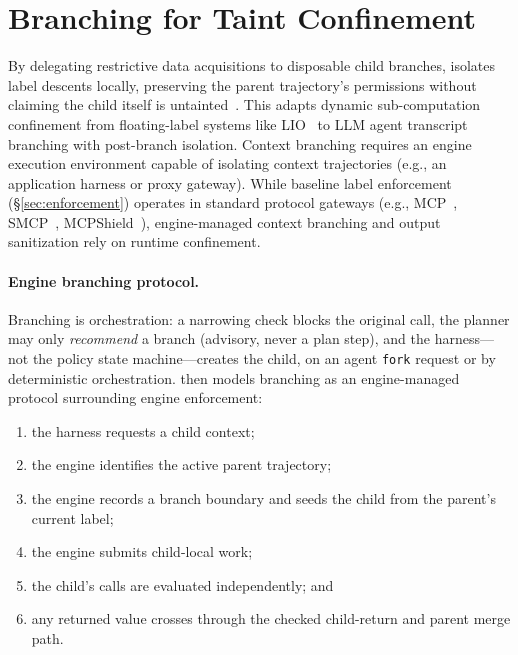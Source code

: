 \section{Branching for Taint Confinement}\label{sec:branching}

By delegating restrictive data acquisitions to disposable child branches, \appa{} isolates label descents locally, preserving the parent trajectory's permissions without claiming the child itself is untainted~\cite{caiGhostAgentRedefining2026}. This adapts dynamic sub-computation confinement from floating-label systems like LIO~\cite{stefan2011flexible} to LLM agent transcript branching with post-branch isolation. Context branching requires an engine execution environment capable of isolating context trajectories (e.g., an application harness or proxy gateway). While baseline label enforcement (\S\ref{sec:enforcement}) operates in standard protocol gateways (e.g., MCP~\cite{mcp2024spec}, SMCP~\cite{hou2026smcp}, MCPShield~\cite{zhou2026mcpshield}), engine-managed context branching and output sanitization rely on runtime confinement.




\paragraph{Engine branching protocol.}
Branching is orchestration: a narrowing check blocks the original call, the planner may only \emph{recommend} a branch (advisory, never a plan step), and the harness---not the \appa{} policy state machine---creates the child, on an agent \nolinkurl{fork} request or by deterministic orchestration. \appa{} then models branching as an engine-managed protocol surrounding engine enforcement:
\begin{enumerate}
  \item the harness requests a child context;
  \item the engine identifies the active parent trajectory;
  \item the \appa{} engine records a branch boundary and seeds the child from the parent's current label;
  \item the engine submits child-local work;
  \item the child's calls are evaluated independently; and
  \item any returned value crosses through the checked child-return and parent merge path.
\end{enumerate}

